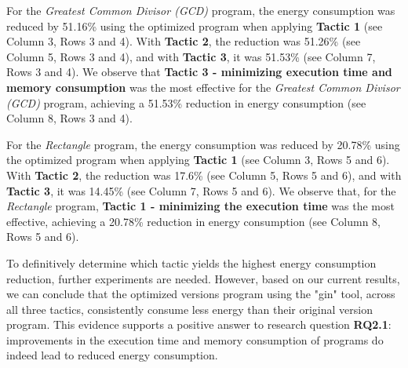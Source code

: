 \vspace{.5em}
For the \textit{Greatest Common Divisor (GCD)} program, the energy consumption was reduced by 51.16\% using the optimized program when applying \textbf{Tactic 1} (see Column 3, Rows 3 and 4). With \textbf{Tactic 2}, the reduction was 51.26\% (see Column 5, Rows 3 and 4), and with \textbf{Tactic 3}, it was 51.53\% (see Column 7, Rows 3 and 4). We observe that \textbf{Tactic 3 - minimizing execution time and memory consumption} was the most effective for the \textit{Greatest Common Divisor (GCD)} program, achieving a 51.53\% reduction in energy consumption (see Column 8, Rows 3 and 4).

\vspace{.5em}
For the \textit{Rectangle} program, the energy consumption was reduced by 20.78\% using the optimized program when applying \textbf{Tactic 1} (see Column 3, Rows 5 and 6). With \textbf{Tactic 2}, the reduction was 17.6\% (see Column 5, Rows 5 and 6), and with \textbf{Tactic 3}, it was 14.45\% (see Column 7, Rows 5 and 6). We observe that, for the \textit{Rectangle} program, \textbf{Tactic 1 - minimizing the execution time} was the most effective, achieving a 20.78\% reduction in energy consumption (see Column 8, Rows 5 and 6).

\vspace{.5em}
To definitively determine which tactic yields the highest energy consumption reduction, further experiments are needed. However, based on our current results, we can conclude that the optimized versions program using the "gin" tool, across all three tactics, consistently consume less energy than their original version program. This evidence supports a positive answer to research question \textbf{RQ2.1}: improvements in the execution time and memory consumption of programs do indeed lead to reduced energy consumption.